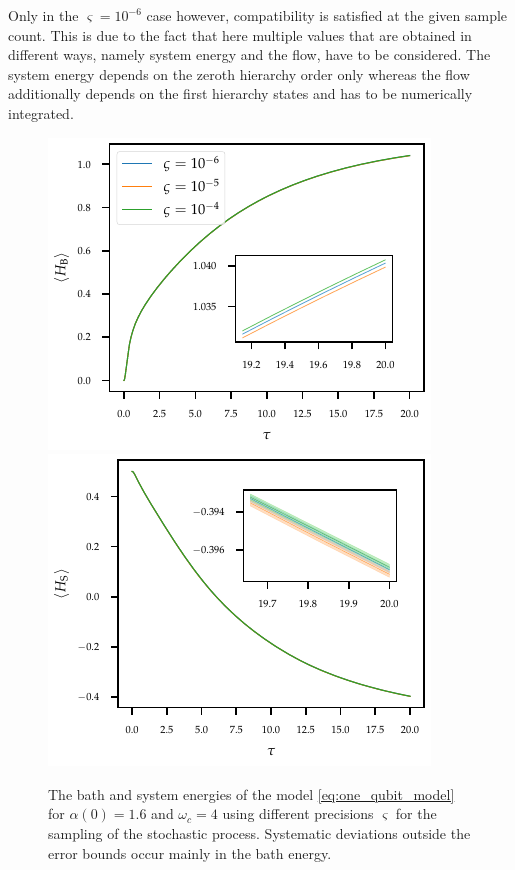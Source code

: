 Only in the \(\varsigma=10^{-6}\) case however, compatibility is
satisfied at the given sample count. This is due to the fact that here
multiple values that are obtained in different ways, namely system
energy and the flow, have to be considered. The system energy depends
on the zeroth hierarchy order only whereas the flow additionally
depends on the first hierarchy states and has to be numerically
integrated.
\begin{figure}[htp]
  \centering
  \includegraphics{figs/one_bath_syst/stocproc_systematics_bath_energy}
  \includegraphics{figs/one_bath_syst/stocproc_systematics_system}
  \caption{\label{fig:stocproc_bath_sys}The bath and system energies of the
    model \cref{eq:one_qubit_model} for \(α(0)=1.6\) and \(ω_c=4\)
    using different precisions \(\varsigma\) for the sampling of the
    stochastic process. Systematic deviations outside the error bounds
  occur mainly in the bath energy.}
\end{figure}

